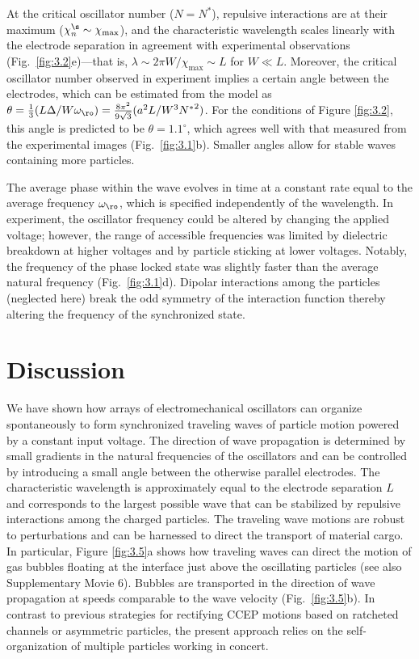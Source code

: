At the critical oscillator number ($N = N^*$), repulsive interactions are at their maximum ($\chi^{\s}_n \sim \chi_{\max}$), and the characteristic wavelength scales linearly with the electrode separation in agreement with experimental observations (Fig.~\ref{fig:3.2}e)---that is, $\lambda\sim2\pi W/ \chi_{\max} \sim L$ for $W\ll L$.  Moreover, the critical oscillator number observed in experiment implies a certain angle between the electrodes, which can be estimated from the model as $\theta = \tfrac{1}{3}(L\Delta /W \omega_{\ro} ) = \tfrac{8 \pi ^2}{9 \sqrt{3}} (a^2 L/W^3 {N^*}^2)$. For the conditions of Figure \ref{fig:3.2}, this angle is predicted to be $\theta = 1.1^\circ$, which agrees well with that measured from the experimental images (Fig.~\ref{fig:3.1}b).  Smaller angles allow for stable waves containing more particles. 

The average phase within the wave evolves in time at a constant rate equal to the average frequency $\omega_{\ro}$, which is specified independently of the wavelength. In experiment, the oscillator frequency could be altered by changing the applied voltage; however, the range of accessible frequencies was limited by dielectric breakdown at higher voltages and by particle sticking at lower voltages\autocite{drews2015contact}. Notably, the frequency of the phase locked state was slightly faster than the average natural frequency (Fig.~\ref{fig:3.1}d). Dipolar interactions among the particles (neglected here) break the odd symmetry of the interaction function thereby altering the frequency of the synchronized state.


\section{Discussion}

We have shown how arrays of electromechanical oscillators can organize spontaneously to form synchronized traveling waves of particle motion powered by a constant input voltage.  The direction of wave propagation is determined by small gradients in the natural frequencies of the oscillators and can be controlled by introducing a small angle between the otherwise parallel electrodes.  The characteristic wavelength is approximately equal to the electrode separation $L$ and corresponds to the largest possible wave that can be stabilized by repulsive interactions among the charged particles.  The traveling wave motions are robust to perturbations and can be harnessed to direct the transport of material cargo.  In particular, Figure \ref{fig:3.5}a shows how traveling waves can direct the motion of gas bubbles floating at the interface just above the oscillating particles (see also Supplementary Movie 6).  Bubbles are transported in the direction of wave propagation at speeds comparable to the wave velocity (Fig.~\ref{fig:3.5}b). In contrast to previous strategies for rectifying CCEP motions based on ratcheted channels\autocite{drews2013ratcheted} or asymmetric particles\autocite{Dou2016}, the present approach relies on the self-organization of multiple particles working in concert. 

